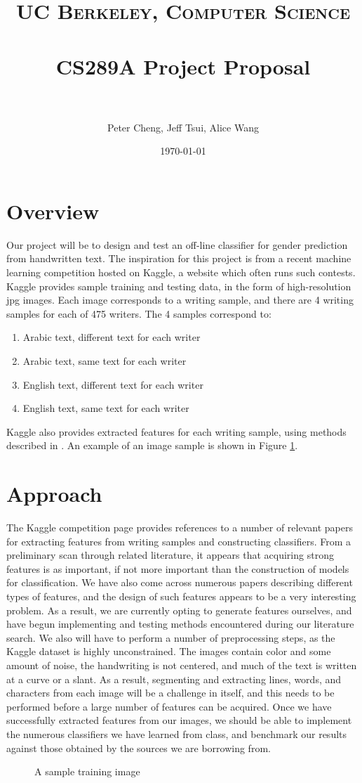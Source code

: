 \documentclass[paper=a4, fontsize=11pt]{scrartcl} %
\title{	
\normalfont \normalsize 
\textsc{UC Berkeley, Computer Science} \\ [25pt] %
\horrule{0.5pt} \\[0.4cm] %
\huge CS289A Project Proposal \\ %
\horrule{2pt} \\[0.5cm] %
}
\author{Peter Cheng, Jeff Tsui, Alice Wang} %
\date{\normalsize\today} %
\numberwithin{equation}{section} %
\numberwithin{figure}{section} %
\numberwithin{table}{section} %
\begin{document}
\maketitle %

\section{Overview}
Our project will be to design and test an off-line classifier for
gender prediction from handwritten text. The inspiration for this
project is from a recent machine learning competition hosted on
Kaggle, a website which often runs such contests\cite{kaggle}. Kaggle
provides sample training and testing data, in the form of
high-resolution jpg images. Each image corresponds to a writing
sample, and there are 4 writing samples for each of 475 writers. The 4
samples correspond to:

\begin{enumerate}
\item Arabic text, different text for each writer
\item Arabic text, same text for each writer
\item English text, different text for each writer
\item English text, same text for each writer
\end{enumerate}

Kaggle also provides extracted features for each writing sample, using
methods described in \cite{geometricFeatures}. An example of an image sample is shown in Figure \ref{fig:sample}.

\section{Approach}
The Kaggle competition page provides references to a number of
relevant papers for extracting features from writing samples and
constructing classifiers. From a preliminary scan through related
literature, it appears that acquiring strong features is as important,
if not more important than the construction of models for
classification. We have also come across numerous papers describing
different types of features, and the design of such features appears
to be a very interesting problem. As a result, we are currently opting
to generate features ourselves, and have begun implementing and
testing methods encountered during our literature search. We also will
have to perform a number of preprocessing steps, as the Kaggle dataset
is highly unconstrained. The images contain color and some amount of
noise, the handwriting is not centered, and much of the text is
written at a curve or a slant. As a result, segmenting and extracting
lines, words, and characters from each image will be a challenge in
itself, and this needs to be performed before a large number of
features can be acquired. Once we have successfully extracted features
from our images, we should be able to implement the numerous
classifiers we have learned from class, and benchmark our results
against those obtained by the sources we are borrowing from.

\begin{figure}
  \centering {}
  \caption{A sample training image\\}
  \label{fig:sample}
\end{figure}

\end{document}
